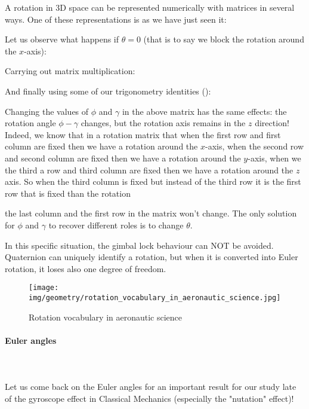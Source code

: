 	A rotation in 3D space can be represented numerically with matrices in several ways. One of these representations is as we have just seen it:
	
	Let us observe what happens if $\theta=0$ (that is to say we block the rotation around the $x$-axis):
	
	Carrying out matrix multiplication:
	
	And finally using some of our trigonometry identities ():
	
	Changing the values of $\phi$ and $\gamma$  in the above matrix has the same effects: the rotation angle $\phi-\gamma$ changes, but the rotation axis remains in the $z$ direction! Indeed, we know that in a rotation matrix that when the first row and first column are fixed then we have a rotation around the $x$-axis, when the second row and second column are fixed then we have a rotation around the $y$-axis, when we the third a row and third column are fixed then we have a rotation around the $z$ axis. So when the third column is fixed but instead of the third row it is the first row that is fixed than the rotation
	
	the last column and the first row in the matrix won't change. The only solution for $\phi$  and $\gamma$  to recover different roles is to change $\theta$.
	
	In this specific situation, the gimbal lock behaviour can NOT be avoided. Quaternion can uniquely identify a rotation, but when it is converted into Euler rotation, it loses also one degree of freedom. 
	\begin{figure}[H]
		\centering
		\texttt{[image: img/geometry/rotation\_vocabulary\_in\_aeronautic\_science.jpg]}
		\caption{Rotation vocabulary in aeronautic science}
	\end{figure}
	
	\pagebreak
	\paragraph{Euler angles}\mbox{}\\\\
	Let us come back on the Euler angles for an important result for our study late of the gyroscope effect in Classical Mechanics (especially the "nutation" effect)!
		
